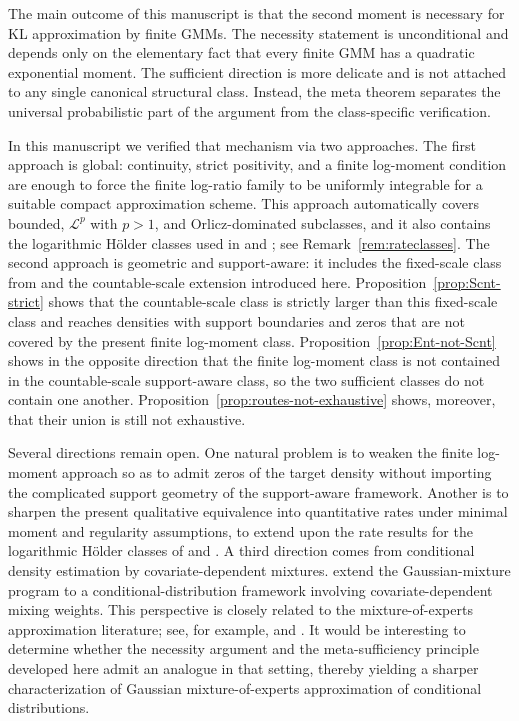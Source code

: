 \documentclass[11pt]{article}
\theoremstyle{definition}
\begin{document}
The main outcome of this manuscript is that the second moment is necessary for KL approximation by finite GMMs. The necessity statement is unconditional and depends only on the elementary fact that every finite GMM has a quadratic exponential moment. The sufficient direction is more delicate and is not attached to any single canonical structural class. Instead, the meta theorem separates the universal probabilistic part of the argument from the class-specific verification.

In this manuscript we verified that mechanism via two approaches. The first approach is global: continuity, strict positivity, and a finite log-moment condition are enough to force the finite log-ratio family to be uniformly integrable for a suitable compact approximation scheme. This approach automatically covers bounded, $\mathcal L^p$ with $p>1$, and Orlicz-dominated subclasses, and it also contains the logarithmic H\"older classes used in \citet{KruijerRousseauvdV2010} and \citet{MaugisRabusseauMichel2013}; see Remark~\ref{rem:rateclasses}. The second approach is geometric and support-aware: it includes the fixed-scale class from \citet{NoretsPelenis2012} and the countable-scale extension introduced here. Proposition~\ref{prop:Scnt-strict} shows that the countable-scale class is strictly larger than this fixed-scale class and reaches densities with support boundaries and zeros that are not covered by the present finite log-moment class. Proposition~\ref{prop:Ent-not-Scnt} shows in the opposite direction that the finite log-moment class is not contained in the countable-scale support-aware class, so the two sufficient classes do not contain one another. Proposition~\ref{prop:routes-not-exhaustive} shows, moreover, that their union is still not exhaustive.

Several directions remain open. One natural problem is to weaken the finite log-moment approach so as to admit zeros of the target density without importing the complicated support geometry of the support-aware framework. Another is to sharpen the present qualitative equivalence into quantitative rates under minimal moment and regularity assumptions, to extend upon the rate results for the logarithmic H\"older classes of \citet{KruijerRousseauvdV2010} and \citet{MaugisRabusseauMichel2013}. A third direction comes from conditional density estimation by covariate-dependent mixtures. \citet{NoretsPelenis2014} extend the Gaussian-mixture program to a conditional-distribution framework involving covariate-dependent mixing weights. This perspective is closely related to the mixture-of-experts approximation literature; see, for example, \citet{NguyenChamroukhiForbes2019} and \citet{NguyenHienTTChamroukhiMcLachlan2021}. It would be interesting to determine whether the necessity argument and the meta-sufficiency principle developed here admit an analogue in that setting, thereby yielding a sharper characterization of Gaussian mixture-of-experts approximation of conditional distributions.
\end{document}
